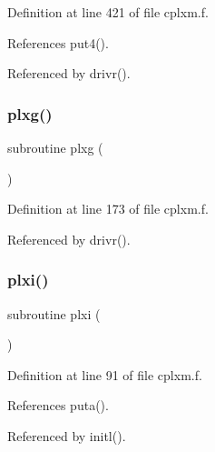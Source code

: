 Definition at line 421 of file cplxm.\+f.



References put4().



Referenced by drivr().

\mbox{\label{cplxm_8f_aeb9a6a91a6c6a76bf8bfb1913470f4bd}} 
\subsubsection{\texorpdfstring{plxg()}{plxg()}}
{\footnotesize\ttfamily subroutine plxg (\begin{DoxyParamCaption}{ }\end{DoxyParamCaption})}



Definition at line 173 of file cplxm.\+f.



Referenced by drivr().

\mbox{\label{cplxm_8f_a06a83e4d1d82ffb6c73c07663a1bca15}} 
\subsubsection{\texorpdfstring{plxi()}{plxi()}}
{\footnotesize\ttfamily subroutine plxi (\begin{DoxyParamCaption}{ }\end{DoxyParamCaption})}



Definition at line 91 of file cplxm.\+f.



References puta().



Referenced by initl().

\mbox{\label{cplxm_8f_a8b488c123c5ec8fb6bd87aa9e12a13e3}} 
